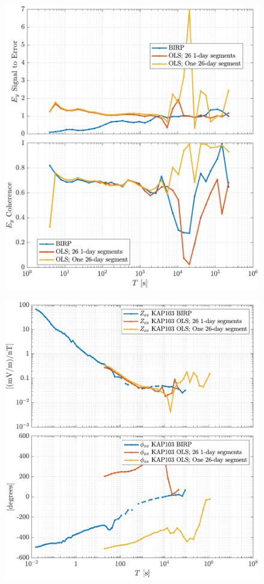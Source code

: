 \documentclass{article}
\begin{document}
\begin{figure}[h!]
\centering
\includegraphics[width=\textwidth]{figures/KAP103_Middelpos/SN_compare-E_y.pdf}
\caption{}
\label{fig:universe}
\end{figure}

\clearpage

\begin{figure}[h!]
\centering
\includegraphics[width=\textwidth]{figures/KAP103_Middelpos/transferfnZ_compare-Z_xx_Magnitude_Phase.pdf}
\caption{}
\label{fig:universe}
\end{figure}
\end{document}
